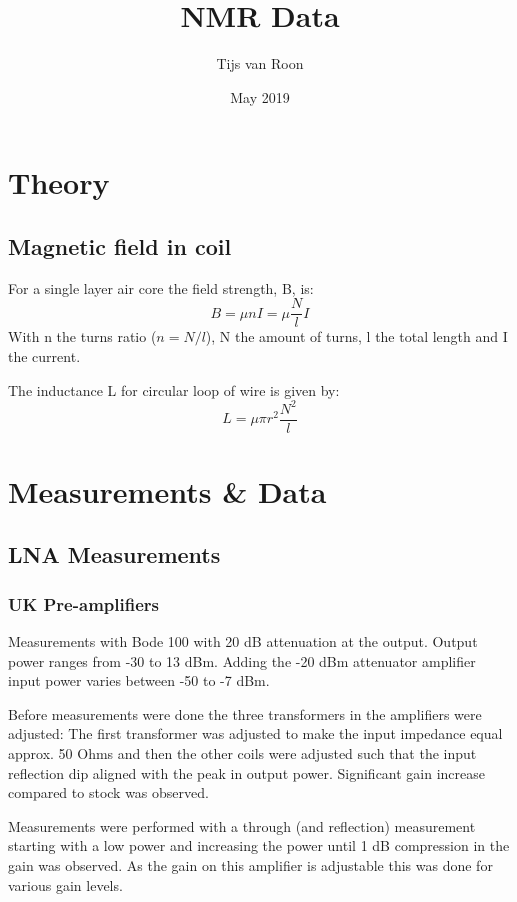 \documentclass{article}
\title{NMR Data}
\author{Tijs van Roon}
\date{May 2019}
\begin{document}
    \maketitle
\section{Theory}
\subsection{Magnetic field in coil}
For a single layer air core the field strength, B, is:
\begin{equation}
    B = \mu n I = \mu \frac{N}{l} I
\end{equation}
With n the turns ratio ($ n= N/l $), N the amount of turns, l the total length and I the current.

The inductance L for circular loop of wire is given by:
\begin{equation}
    L = \mu \pi r^2\frac{ N^2  }{ l }
\end{equation}

\section{Measurements \& Data}
\subsection{LNA Measurements}
\subsubsection{UK Pre-amplifiers}
Measurements with Bode 100 with 20 dB attenuation at the output. Output power ranges from -30 to 13 dBm. Adding the -20 dBm attenuator amplifier input power varies between -50 to -7 dBm.

Before measurements were done the three transformers in the amplifiers were adjusted: 
The first transformer was adjusted to make the input impedance equal approx. 50 Ohms and then the other coils were adjusted such that the input reflection dip aligned with the peak in output power. Significant gain increase compared to stock was observed.

Measurements were performed with a through (and reflection) measurement starting with a low power and increasing the power until 1 dB compression in the gain was observed. As the gain on this amplifier is adjustable this was done for various gain levels.
\end{document}
